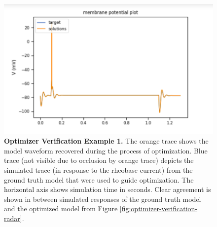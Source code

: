 \begin{figure}
    \centering
    \includegraphics[scale=0.85]{figures/simulated_data_supra_threshold.png}
    \caption[Optimizer Verification Example 1]{\textbf{Optimizer Verification Example 1.} The orange trace shows the model waveform recovered during the process of optimization.
    Blue trace (not visible due to occlusion by orange trace) depicts the simulated trace (in response to the rheobase current) from the ground truth model that were used to guide optimization.
    The horizontal axis shows simulation time in seconds.
    Clear agreement is shown in between simulated responses of the ground truth model and the optimized model from Figure \ref{fig:optimizer-verification-radar}. 
}
\label{fig:optimizer-verification-traces-1}
\end{figure}

